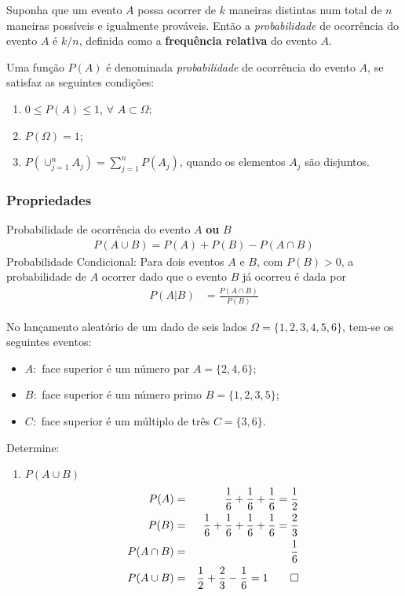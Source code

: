 \begin{definition}[Clássica]
	Suponha que um evento $A$ possa ocorrer de $k$ maneiras distintas num total de $n$ maneiras possíveis e igualmente prováveis. Então a \emph{probabilidade} de ocorrência do evento $A$ é $k/n$, definida como a \textbf{frequência relativa} do evento $A$.
\end{definition}
\begin{definition}
	Uma função $P(A)$ é denominada \emph{probabilidade} de ocorrência do evento $A$, se satisfaz as seguintes condições:
	\begin{enumerate}[label=\roman *)]
		\item $0\leq P(A)\leq 1$, $\forall$ $A\subset \Omega$;
		\item $P(\Omega)=1$;
		\item $P(\cup_{j=1}^nA_j)=\sum_{j=1}^n P(A_j)$, quando os elementos $A_j$ são disjuntos.
	\end{enumerate}
\end{definition}

\subsubsection{Propriedades}
\noindent Probabilidade de ocorrência do evento $A$ \textbf{ou} $B$
\begin{align}
	P(A\cup B)=P(A)+P(B)-P(A\cap B)
\end{align}
Probabilidade Condicional: Para dois eventos $A$ e $B$, com $P(B)>0$, a probabilidade de $A$ ocorrer dado que o evento $B$ já ocorreu é dada por
\begin{align}
	P(A|B)&=\frac{P(A\cap B)}{P(B)}
\end{align} 
\begin{exmp}
	No lançamento aleatório de um dado de seis lados $\Omega=\{1,2,3,4,5,6\}$, tem-se os seguintes eventos:
	\begin{itemize}
		\item $A:$ face superior é um número par $A=\{2,4,6\}$;
		\item $B:$ face superior é um número primo $B=\{1,2,3,5\}$;
		\item $C:$ face superior é um múltiplo de três $C=\{3,6\}$. 
	\end{itemize}
	Determine:
	\begin{enumerate}[label=\alph *)]
		\item $P(A\cup B)$
			\begin{eqnarray*}
				P(A)&=&\frac{1}{6}+\frac{1}{6}+\frac{1}{6}=\frac{1}{2}\\
				P(B)&=&\frac{1}{6}+\frac{1}{6}+\frac{1}{6}+\frac{1}{6}=\frac{2}{3}\\
				P(A\cap B)&=&\frac{1}{6}\\
				P(A\cup B)&=&\frac{1}{2}+\frac{2}{3}-\frac{1}{6}=1\qed
			\end{eqnarray*}
	\end{enumerate}
\end{exmp}